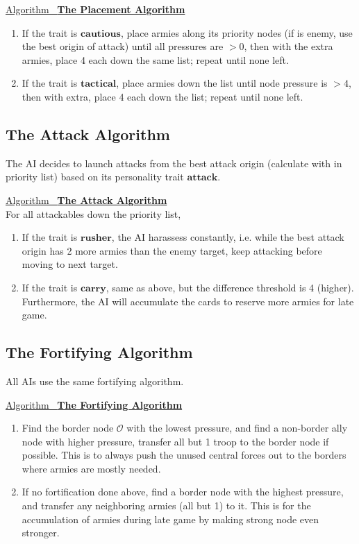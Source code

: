 \documentclass[12pt]{article}  %
\newcommand{\algtitle}[1]{\underline{Algorithm \ {\bf #1}} \vspace*{1mm}\\}
\begin{document}
\algtitle{The Placement Algorithm}
\begin{enumerate}
	\item If the trait is $\textbf{cautious}$, place armies along its  priority nodes (if is enemy, use the best origin of attack) until all pressures are $>0$, then with the extra armies, place 4 each down the same list; repeat until none left.
	\item If the trait is $\textbf{tactical}$, place armies down the list until node pressure is $>4$, then with extra, place 4 each down the list; repeat until none left.
\end{enumerate}







\subsection{The Attack Algorithm}
The AI decides to launch attacks from the best attack origin (calculate with in priority list) based on its personality trait $\textbf{attack}$.

\algtitle{The Attack Algorithm}
For all attackables down the priority list,
\begin{enumerate}
	\item If the trait is $\textbf{rusher}$, the AI harassess constantly, i.e. while the best attack origin has 2 more armies than the enemy target, keep attacking before moving to next target.
	\item If the trait is $\textbf{carry}$, same as above, but the difference threshold is 4 (higher). Furthermore, the AI will accumulate the cards to reserve more armies for late game.
\end{enumerate}








\subsection{The Fortifying Algorithm}
All AIs use the same fortifying algorithm.

\algtitle{The Fortifying Algorithm}

\begin{enumerate}
	\item Find the border node $\mathcal{O}$ with the lowest pressure, and find a non-border ally node with higher pressure, transfer all but 1 troop to the border node if possible. This is to always push the unused central forces out to the borders where armies are mostly needed.
	\item If no fortification done above, find a border node with the highest pressure, and transfer any neighboring armies (all but 1) to it. This is for the accumulation of armies during late game by making strong node even stronger.
\end{enumerate}
\end{document}
